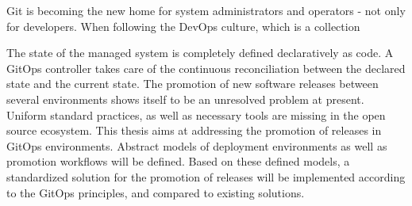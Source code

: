 

\noindent

Git is becoming the new home for system administrators and operators
- not only for developers.
When following the DevOps culture,
which is a collection

The state of the managed system is
completely defined declaratively as code. A GitOps controller
takes care of the continuous reconciliation between the
declared state and the current state.
The promotion of new software releases between several environments
shows itself to be an unresolved problem at present.
Uniform standard practices, as well as necessary tools are missing in the open source ecosystem.
This thesis aims at addressing
the promotion of releases in GitOps environments.
Abstract models of deployment environments as well as promotion workflows
will be defined.
Based on these defined models,
a standardized solution for the promotion of releases
will be implemented according to the GitOps principles,
and compared to existing solutions.



